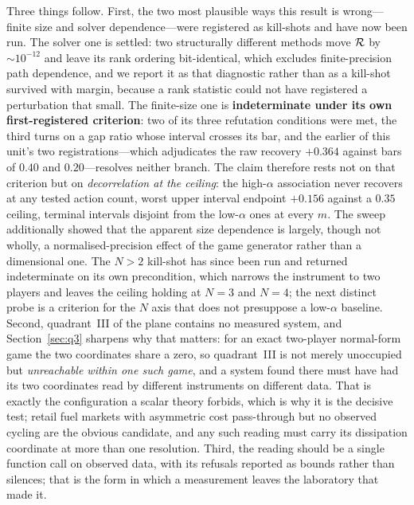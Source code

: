 Three things follow. First, the two most plausible ways this result is wrong---finite size
and solver dependence---were registered as kill-shots and have now been run. The solver one
is settled: two structurally different methods move $\mathcal{R}$ by $\sim\!10^{-12}$ and leave its
rank ordering bit-identical, which excludes finite-precision path dependence, and we report
it as that diagnostic rather than as a kill-shot survived with margin, because a rank
statistic could not have registered a perturbation that small. The finite-size one is
\textbf{indeterminate under its own first-registered criterion}: two of its three refutation
conditions were met, the third turns on a gap ratio whose interval crosses its bar, and the
earlier of this unit's two registrations---which adjudicates the raw recovery $+0.364$
against bars of $0.40$ and $0.20$---resolves neither branch. The claim therefore rests not on
that criterion but on \emph{decorrelation at the ceiling}: the high-$\alpha$ association
never recovers at any tested action count, worst upper interval endpoint $+0.156$ against a
$0.35$ ceiling, terminal intervals disjoint from the low-$\alpha$ ones at every $m$. The
sweep additionally showed that the apparent size dependence is largely, though not wholly, a
normalised-precision effect of the game generator rather than a dimensional one. The $N>2$
kill-shot has since been run and returned indeterminate on its own precondition, which
narrows the instrument to two players and leaves the ceiling holding at $N=3$ and $N=4$;
the next distinct probe is a criterion for the $N$ axis that does not presuppose a
low-$\alpha$ baseline. Second,
quadrant~III of the plane contains no measured system, and
Section~\ref{sec:q3} sharpens why that matters: for an exact two-player normal-form game
the two coordinates share a zero, so quadrant~III is not merely unoccupied but
\emph{unreachable within one such game}, and a system found there must have had its two
coordinates read by different instruments on different data. That is exactly the
configuration a scalar theory forbids, which is why it is the decisive test; retail fuel
markets with asymmetric cost pass-through but no observed cycling are the obvious
candidate, and any such reading must carry its dissipation coordinate at more than one
resolution. Third, the reading
should be a single function call on observed data, with its refusals reported as bounds
rather than silences; that is the form in which a measurement leaves the laboratory that made
it.
